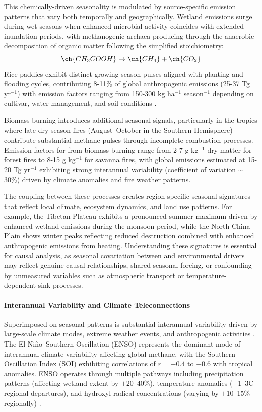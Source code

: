 This chemically-driven seasonality is modulated by source-specific emission patterns that vary both temporally and geographically. Wetland emissions surge during wet seasons when enhanced microbial activity coincides with extended inundation periods, with methanogenic archaea producing  through the anaerobic decomposition of organic matter following the simplified stoichiometry:
\begin{equation}
	\ch{CH_3COOH} \rightarrow \ch{CH_4} + \ch{CO_2}
\end{equation}
Rice paddies exhibit distinct growing-season pulses aligned with planting and flooding cycles, contributing 8-11\% of global anthropogenic  emissions (25-37 Tg  yr$^{-1}$) with emission factors ranging from 150-300 kg  ha$^{-1}$ season$^{-1}$ depending on cultivar, water management, and soil conditions \cite{Pandey2017, Yuan2022}.

Biomass burning introduces additional seasonal signals, particularly in the tropics where late dry-season fires (August--October in the Southern Hemisphere) contribute substantial methane pulses through incomplete combustion processes. Emission factors for  from biomass burning range from 2-7 g kg$^{-1}$ dry matter for forest fires to 8-15 g kg$^{-1}$ for savanna fires, with global emissions estimated at 15-20 Tg  yr$^{-1}$ exhibiting strong interannual variability (coefficient of variation $\sim$30\%) driven by climate anomalies and fire weather patterns.

The coupling between these processes creates region-specific seasonal signatures that reflect local climate, ecosystem dynamics, and land use patterns. For example, the Tibetan Plateau exhibits a pronounced summer maximum driven by enhanced wetland emissions during the monsoon period, while the North China Plain shows winter peaks reflecting reduced  destruction combined with enhanced anthropogenic emissions from heating. Understanding these signatures is essential for causal analysis, as seasonal covariation between  and environmental drivers may reflect genuine causal relationships, shared seasonal forcing, or confounding by unmeasured variables such as atmospheric transport or temperature-dependent sink processes.

\paragraph{Interannual Variability and Climate Teleconnections}
Superimposed on seasonal patterns is substantial interannual variability driven by large-scale climate modes, extreme weather events, and anthropogenic activities \cite{feng_tropical_2022}. The El Ni{\~n}o--Southern Oscillation (ENSO) represents the dominant mode of interannual climate variability affecting global methane, with the Southern Oscillation Index (SOI) exhibiting correlations of $r = -0.4$ to $-0.6$ with tropical  anomalies. ENSO operates through multiple pathways including precipitation patterns (affecting wetland extent by $\pm$20--40\%), temperature anomalies ($\pm$1--3\textdegree C regional departures), and hydroxyl radical concentrations (varying by $\pm$10--15\% regionally) \cite{Pandey2017}.

